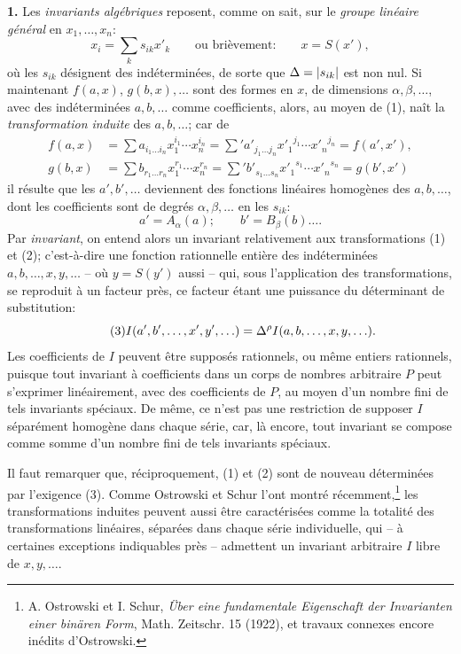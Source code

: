 \textbf{1.} Les \emph{invariants algébriques} reposent, comme on sait, sur le \emph{groupe linéaire général} en $x_1,\ldots,x_n$:
\[
\tag{1}
x_i=\sum_k s_{ik}x'_k
\qquad\text{ou brièvement:}\qquad
x=S(x'),
\]
où les $s_{ik}$ désignent des indéterminées, de sorte que $\Delta=|s_{ik}|$ est non nul. Si maintenant $f(a,x)$, $g(b,x),\ldots$ sont des formes en $x$, de dimensions $\alpha,\beta,\ldots$, avec des indéterminées $a,b,\ldots$ comme coefficients, alors, au moyen de (1), naît la \emph{transformation induite} des $a,b,\ldots$; car de
\[
\begin{aligned}
f(a,x)&=\sum a_{i_1\ldots i_n}x_1^{i_1}\cdots x_n^{i_n}
      =\sum{}' a'_{j_1\ldots j_n}{x'_1}^{j_1}\cdots {x'_n}^{j_n}
      =f(a',x'),\\
g(b,x)&=\sum b_{r_1\ldots r_n}x_1^{r_1}\cdots x_n^{r_n}
      =\sum{}' b'_{s_1\ldots s_n}{x'_1}^{s_1}\cdots {x'_n}^{s_n}
      =g(b',x')
\end{aligned}
\]
il résulte que les $a',b',\ldots$ deviennent des fonctions linéaires homogènes des $a,b,\ldots$, dont les coefficients sont de degrés $\alpha,\beta,\ldots$ en les $s_{ik}$:
\[
\tag{2}
a'=A_\alpha(a);\qquad b'=B_\beta(b)\ldots .
\]
Par \emph{invariant}, on entend alors un invariant relativement aux transformations (1) et (2); c'est-à-dire une fonction rationnelle entière des indéterminées $a,b,\ldots,x,y,\ldots$ -- où $y=S(y')$ aussi -- qui, sous l'application des transformations, se reproduit à un facteur près, ce facteur étant une puissance du déterminant de substitution:
\[
\tag{3}
I(a',b',\ldots,x',y',\ldots)=\Delta^\rho I(a,b,\ldots,x,y,\ldots).
\]
Les coefficients de $I$ peuvent être supposés rationnels, ou même entiers rationnels, puisque tout invariant à coefficients dans un corps de nombres arbitraire $P$ peut s'exprimer linéairement, avec des coefficients de $P$, au moyen d'un nombre fini de tels invariants spéciaux. De même, ce n'est pas une restriction de supposer $I$ séparément homogène dans chaque série, car, là encore, tout invariant se compose comme somme d'un nombre fini de tels invariants spéciaux.

Il faut remarquer que, réciproquement, (1) et (2) sont de nouveau déterminées par l'exigence (3). Comme Ostrowski et Schur l'ont montré récemment,\footnote{A. Ostrowski et I. Schur, \emph{Über eine fundamentale Eigenschaft der Invarianten einer binären Form}, Math. Zeitschr. 15 (1922), et travaux connexes encore inédits d'Ostrowski.} les transformations induites peuvent aussi être caractérisées comme la totalité des transformations linéaires, séparées dans chaque série individuelle, qui -- à certaines exceptions indiquables près -- admettent un invariant arbitraire $I$ libre de $x,y,\ldots$.

